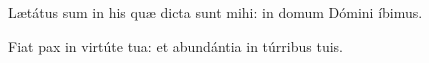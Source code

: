 \Rbardot{} Lætátus sum in his quæ dicta sunt mihi: in domum Dómini íbimus.

\Vbardot{} Fiat pax in virtúte tua: et abundántia in túrribus tuis.
